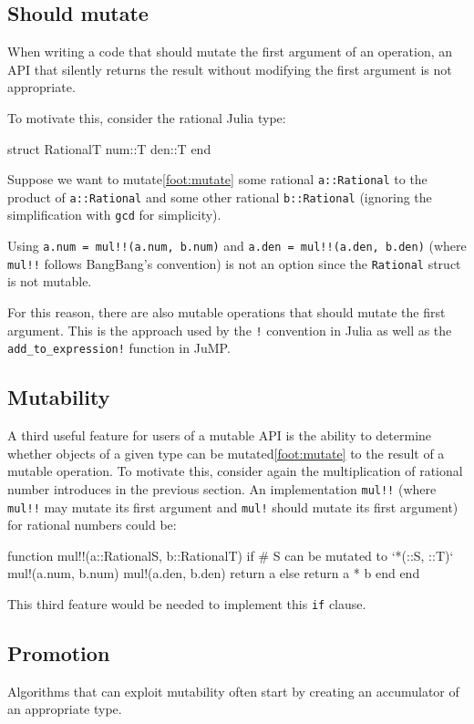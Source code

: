 \documentclass{juliacon}
\begin{document}
\subsection{Should mutate}
When writing a code that should mutate the first argument of an operation,
an API that silently returns the result without modifying the first argument is not appropriate.

To motivate this, consider the rational Julia type:
\begin{jllisting}
struct Rational{T}
    num::T
    den::T
end
\end{jllisting}
Suppose we want to mutate\cref{foot:mutate} some rational \lstinline|a::Rational| to the
product of \lstinline|a::Rational| and some other rational \lstinline|b::Rational|
(ignoring the simplification with \lstinline|gcd| for simplicity).

Using \lstinline|a.num = mul!!(a.num, b.num)| and
\lstinline|a.den = mul!!(a.den, b.den)|
(where \lstinline|mul!!| follows BangBang's convention)
is not an option since
the \lstinline|Rational| struct is not mutable.

For this reason, there are also mutable operations that should mutate the first argument.
This is the approach used by the \lstinline|!| convention in Julia
as well as the \lstinline|add_to_expression!| function in JuMP.

\subsection{Mutability}
A third useful feature for users of a mutable API is the ability to
determine whether objects of a given type can be mutated\cref{foot:mutate} to the result of a mutable operation.
To motivate this, consider again the multiplication of rational number introduces in the previous section.
An implementation \lstinline|mul!!| (where \lstinline|mul!!| may mutate its first argument and \lstinline|mul!| should mutate its first argument)
for rational numbers could be:
\begin{jllisting}
function mul!!(a::Rational{S}, b::Rational{T})
    if # S can be mutated to `*(::S, ::T)`
        mul!(a.num, b.num)
        mul!(a.den, b.den)
        return a
    else
        return a * b
    end
end
\end{jllisting}
This third feature would be needed to implement this \lstinline|if| clause.

\subsection{Promotion}
Algorithms that can exploit mutability often start by creating an accumulator of
an appropriate type.
\end{document}
